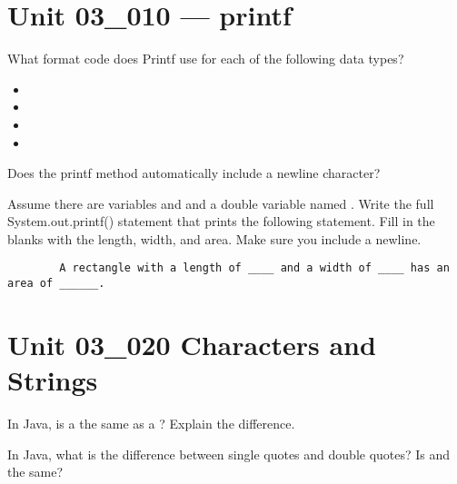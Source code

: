\documentclass[letterpaper,12pt]{exam}
\newcommand{\unit}{Unit 03}
\begin{document}
\begin{questions}

\section*{\unit\_010 --- printf} %

\begin{samepage}
	\question What format code does Printf use for each of the following data types?
	  \begin{itemize}
		\item {}
		\vspace{5mm}
		\item {}
		\vspace{5mm}
		\item {}
		\vspace{5mm}
		\item {}
		\vspace{5mm}
	   \end{itemize}
\end{samepage}
\begin{samepage}
	\question Does the printf method automatically include a newline character?
	\vspace{5mm}
\end{samepage}
\begin{samepage}
	\question Assume there are variables  and  and a double variable named .  Write the full System.out.printf() statement that prints the following statement.  Fill in the blanks with the length, width, and area.  Make sure you include a newline.
	\begin{verbatim}
		A rectangle with a length of ____ and a width of ____ has an area of ______.
	\end{verbatim}

	\vspace{5mm}
\end{samepage}
\section*{\unit\_020 Characters and Strings} %
\begin{samepage}
	\question In Java, is a  the same as a ?  Explain the difference.
	\vspace{5mm}
\end{samepage}
\begin{samepage}
	\question In Java, what is the difference between single quotes and double quotes?  Is  and  the same?
	\vspace{5mm}
\end{samepage}


\end{questions}
\end{document}
